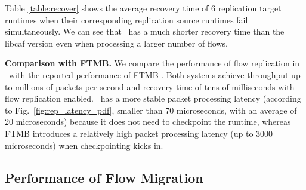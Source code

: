 Table \ref{table:recover} shows the average recovery time of 6 replication target runtimes when their corresponding replication source runtimes fail simultaneously. We can see that \nfactor~has a much shorter recovery time than the libcaf version even when processing a larger number of flows.

\textbf{Comparison with FTMB.} We compare the performance of flow replication in \nfactor~with the reported performance of FTMB \cite{sherry2015rollback}. Both systems achieve throughput up to millions of packets per second and recovery time of tens of milliseconds with flow replication enabled. \nfactor~has a more stable packet processing latency (according to Fig.~\ref{fig:rep_latency_pdf}, smaller than 70 microseconds, with an average of 20 microseconds) because it does not need to checkpoint the runtime, whereas FTMB introduces a relatively high packet processing latency (up to 3000 microseconds) when checkpointing kicks in.

\subsection{Performance of Flow Migration}
\label{sec:fmp}

